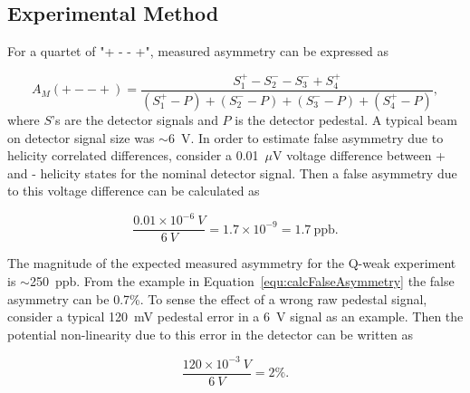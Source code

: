 

\subsection{Experimental Method}
\label{Experimental Method}

For a quartet of "+ - - +", measured asymmetry can be expressed as

\begin{equation} \label{equ:asymmetry}
A_{M} (+--+) = \frac{ S^{+}_{1} - S^{-}_{2} - S^{-}_{3} + S^{+}_{4} }{ (S^{+}_{1}-P) + (S^{-}_{2}-P) + (S^{-}_{3}-P) + (S^{+}_{4}-P) },
\end{equation}
where $S$'s are the detector signals and $P$ is the detector pedestal. A typical beam on detector signal size was $\sim$6~V. In order to estimate false asymmetry due to helicity correlated differences, consider a 0.01~$\mu$V voltage difference between + and - helicity states for the nominal detector signal. Then a false asymmetry due to this voltage difference can be calculated as 

\begin{equation} \label{equ:calcFalseAsymmetry}
\frac{0.01\times10^{-6}~V}{6~V} = 1.7\times10^{-9} = 1.7~\text{ppb.}
\end{equation}

The magnitude of the expected measured asymmetry for the Q-weak experiment is $\sim$250~ppb. From the example in Equation~\ref{equ:calcFalseAsymmetry} the false asymmetry can be 0.7\%. 
To sense the effect of a wrong raw pedestal signal, consider a typical 120~mV pedestal error in a 6~V signal as an example. Then the potential non-linearity due to this error in the detector can be written as

\begin{equation} \label{equ:calcPedError}
\frac{120\times10^{-3}~V}{6~V} = 2\%.
\end{equation}

